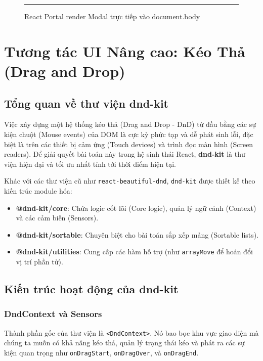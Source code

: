 \begin{figure}[H]
    \centering
    \rule{0.8\textwidth}{0.3\textwidth}
    \caption{React Portal render Modal trực tiếp vào document.body}
\end{figure}


\chapter{Tương tác UI Nâng cao: Kéo Thả (Drag and Drop)}

\section{Tổng quan về thư viện dnd-kit}
Việc xây dựng một hệ thống kéo thả (Drag and Drop - DnD) từ đầu bằng các sự kiện chuột (Mouse events) của DOM là cực kỳ phức tạp và dễ phát sinh lỗi, đặc biệt là trên các thiết bị cảm ứng (Touch devices) và trình đọc màn hình (Screen readers). Để giải quyết bài toán này trong hệ sinh thái React, \textbf{dnd-kit} là thư viện hiện đại và tối ưu nhất tính tới thời điểm hiện tại.

Khác với các thư viện cũ như \texttt{react-beautiful-dnd}, \texttt{dnd-kit} được thiết kế theo kiến trúc module hóa:
\begin{itemize}
    \item \textbf{@dnd-kit/core}: Chứa logic cốt lõi (Core logic), quản lý ngữ cảnh (Context) và các cảm biến (Sensors).
    \item \textbf{@dnd-kit/sortable}: Chuyên biệt cho bài toán sắp xếp mảng (Sortable lists).
    \item \textbf{@dnd-kit/utilities}: Cung cấp các hàm hỗ trợ (như \texttt{arrayMove} để hoán đổi vị trí phần tử).
\end{itemize}

\section{Kiến trúc hoạt động của dnd-kit}

\subsection{DndContext và Sensors}
Thành phần gốc của thư viện là \texttt{<DndContext>}. Nó bao bọc khu vực giao diện mà chúng ta muốn có khả năng kéo thả, quản lý trạng thái kéo và phát ra các sự kiện quan trọng như \texttt{onDragStart}, \texttt{onDragOver}, và \texttt{onDragEnd}.

